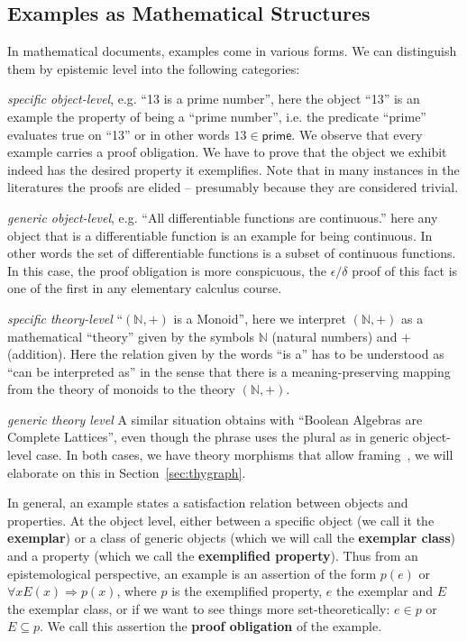 \documentclass[11pt]{bluenote}
\def\cn#1{\mathsf{#1}}
\def\defemph{\textbf}
\begin{document}
\subsection{Examples as Mathematical Structures}
In mathematical documents, examples come in various forms. We can distinguish them by
epistemic level into the following categories: 
\begin{compactenum}
\item \emph{specific object-level}, e.g. ``13 is a prime number'', here the object ``13''
  is an example the property of being a ``prime number'', i.e. the predicate ``prime''
  evaluates true on ``13'' or in other words $13\in\cn{prime}$. We observe that every
  example carries a proof obligation. We have to prove that the object we exhibit indeed
  has the desired property it exemplifies. Note that in many instances in the literatures
  the proofs are elided -- presumably because they are considered trivial. 
\item \emph{generic object-level}, e.g. ``All differentiable functions are continuous.''
  here any object that is a differentiable function is an example for being continuous. In
  other words the set of differentiable functions is a subset of continuous functions. In
  this case, the proof obligation is more conspicuous, the $\epsilon/\delta$ proof of this
  fact is one of the first in any elementary calculus course.
\item \emph{specific theory-level} ``$(\mathbb{N},+)$ is a Monoid'', here we interpret
  $(\mathbb{N},+)$ as a mathematical ``theory'' given by the symbols $\mathbb{N}$ (natural
  numbers) and $+$ (addition). Here the relation given by the words ``is a'' has to be
  understood as ``can be interpreted as'' in the sense that there is a meaning-preserving
  mapping from the theory of monoids to the theory $(\mathbb{N},+)$.
\item \emph{generic theory level} A similar situation obtains with ``Boolean Algebras are
  Complete Lattices'', even though the phrase uses the plural as in generic object-level
  case.  In both cases, we have theory morphisms that allow
  framing~\cite{KohKoh:sifemp09}, we will elaborate on this in Section~\ref{sec:thygraph}.
\end{compactenum}
In general, an example states a satisfaction relation between objects and properties. At
the object level, either between a specific object (we call it the \defemph{exemplar}) or
a class of generic objects (which we will call the \defemph{exemplar class}) and a property (which we
call the \defemph{exemplified property}). Thus from an epistemological perspective, an
example is an assertion of the form $p(e)$ or $\forall{x} E(x)\Rightarrow p(x)$, where $p$
is the exemplified property, $e$ the exemplar and $E$ the exemplar class, or if we want to
see things more set-theoretically: $e\in p$ or $E\subseteq p$. We call this assertion the
\defemph{proof obligation} of the example.
\end{document}
